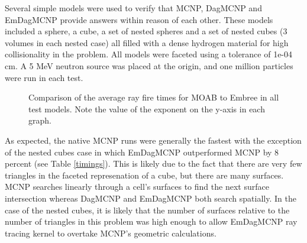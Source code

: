 \documentclass{anstrans}
\begin{document}
Several simple models were used to verify that MCNP, DagMCNP and EmDagMCNP provide answers within reason of each other. These models included a sphere, a cube, a set of nested spheres and a set of nested cubes (3 volumes in each nested case) all filled with a dense hydrogen material for high collisionality in the problem. All models were faceted using a tolerance of 1e-04 cm. A 5 MeV neutron source was placed at the origin, and one million particles were run in each test.


\begin{figure}[H]

  \begin{center}
    
    \caption{Comparison of the average ray fire times for MOAB to Embree in all test models. Note the value of the exponent on the y-axis in each graph. \label{rftiming}}
    
  \end{center}

\end{figure}

As expected, the native MCNP runs were generally the fastest with the exception of the nested cubes case in which EmDagMCNP outperformed MCNP by 8 percent (see Table \ref{timings}). This is likely due to the fact that there are very few triangles in the faceted represenation of a cube, but there are many surfaces. MCNP searches linearly through a cell's surfaces to find the next surface intersection whereas DagMCNP and EmDagMCNP both search spatially. In the case of the nested cubes, it is likely that the number of surfaces relative to the number of triangles in this problem was high enough to allow EmDagMCNP ray tracing kernel to overtake MCNP's geometric calculations.
\end{document}

